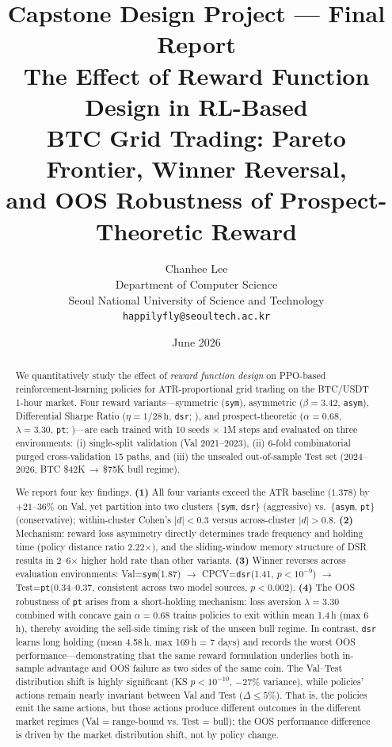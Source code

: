 \documentclass[11pt, a4paper]{article}
\title{
    \vspace{-1cm}
    {\large Capstone Design Project --- Final Report}\\[0.8em]
    \textbf{The Effect of Reward Function Design in RL-Based\\
    BTC Grid Trading: Pareto Frontier, Winner Reversal,\\
    and OOS Robustness of Prospect-Theoretic Reward}
}
\author{
    Chanhee Lee\\
    Department of Computer Science\\
    Seoul National University of Science and Technology\\
    \texttt{happilyfly@seoultech.ac.kr}
}
\date{June 2026}
\begin{document}
\maketitle
\thispagestyle{empty}

\begin{abstract}
We quantitatively study the effect of \emph{reward function design} on PPO-based
reinforcement-learning policies for ATR-proportional grid trading on the BTC/USDT
1-hour market. Four reward variants---symmetric (\texttt{sym}), asymmetric
($\beta=3.42$, \texttt{asym}), Differential Sharpe Ratio
($\eta=1/28\,\mathrm{h}$, \texttt{dsr}; \citealt{moody2001dsr}), and
prospect-theoretic ($\alpha=0.68$, $\lambda=3.30$, \texttt{pt};
\citealt{kahneman1979prospect})---are each trained with 10 seeds $\times$ 1M steps
and evaluated on three environments: (i) single-split validation
(Val 2021--2023), (ii) 6-fold combinatorial purged cross-validation
\citep{lopezdeprado2018advances} 15 paths, and (iii) the unsealed
out-of-sample Test set (2024--2026, BTC \$42K\,$\to$\,\$75K bull regime).

We report four key findings.
\textbf{(1)} All four variants exceed the ATR baseline ($1.378$) by
$+21$--$36\%$ on Val, yet partition into two clusters
\{\texttt{sym}, \texttt{dsr}\} (aggressive) vs.\
\{\texttt{asym}, \texttt{pt}\} (conservative); within-cluster Cohen's $|d|<0.3$
versus across-cluster $|d|>0.8$.
\textbf{(2)} Mechanism: reward loss asymmetry directly determines trade frequency
and holding time (policy distance ratio 2.22$\times$), and the sliding-window
memory structure of DSR results in 2--6$\times$ higher hold rate than other
variants.
\textbf{(3)} Winner reverses across evaluation environments: Val=\texttt{sym}(1.87)
$\to$ CPCV=\texttt{dsr}(1.41, $p<10^{-9}$) $\to$ Test=\texttt{pt}(0.34--0.37,
consistent across two model sources, $p<0.002$).
\textbf{(4)} The OOS robustness of \texttt{pt} arises from a short-holding
mechanism: loss aversion $\lambda=3.30$ combined with concave gain $\alpha=0.68$
trains policies to exit within mean 1.4\,h (max 6\,h), thereby avoiding the
sell-side timing risk of the unseen bull regime. In contrast, \texttt{dsr} learns
long holding (mean 4.58\,h, max 169\,h = 7 days) and records the worst OOS
performance---demonstrating that the same reward formulation underlies both
in-sample advantage and OOS failure as two sides of the same coin.
The Val--Test distribution shift is highly significant
(KS $p<10^{-10}$, $-27\%$ variance), while policies' actions remain nearly
invariant between Val and Test ($\Delta \leq 5\%$). That is, the policies
emit the same actions, but those actions produce different outcomes in the
different market regimes (Val = range-bound vs. Test = bull); the OOS
performance difference is driven by the market distribution shift, not by
policy change.


\end{abstract}
\end{document}
